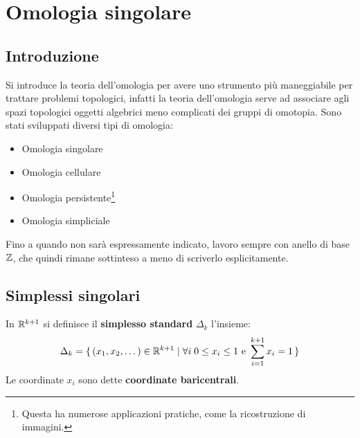 \chapter{Omologia singolare}

\section{Introduzione}

Si introduce la teoria dell'omologia per avere uno strumento più maneggiabile
per trattare problemi topologici, infatti la teoria dell'omologia serve ad
associare agli spazi topologici oggetti algebrici meno complicati dei gruppi di
omotopia. Sono stati sviluppati diversi tipi di omologia:
\begin{itemize}
\item Omologia singolare
\item Omologia cellulare
\item Omologia persistente\footnote{Questa ha numerose applicazioni pratiche, come la ricostruzione di immagini.}
\item Omologia simpliciale
\end{itemize}
Fino a quando non sarà espressamente indicato, lavoro sempre con anello di base
$ \mathbb{Z} $, che quindi rimane sottinteso a meno di scriverlo esplicitamente.

\section{Simplessi singolari}

\begin{definition}
  In $ \mathbb{R}^{k+1} $ si definisce il \textbf{simplesso standard} $ \Delta_k $ l'insieme:
  \[
    \Delta_k = \set{(x_1,x_2,\dots) \in \mathbb{R}^{k+1} | \forall i \; 0 \leq x_i \leq 1 \text{ e } \sum_{i=1}^{k+1}x_i = 1}
  \]
  Le coordinate $ x_i $ sono dette \textbf{coordinate baricentrali}.
\end{definition}

